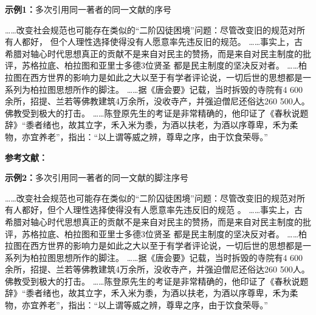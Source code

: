 \documentclass[twoside]{article}%
\begin{document}
\begin{refsection}
\textbf{示例1：}多次引用同一著者的同一文献的序号

……改变社会规范也可能存在类似的“二阶囚徒困境”问题：尽管改变旧的规范对所有人都好，
但个人理性选择使得没有人愿意率先违反旧的规范\cite{Sunstein1996-903-903}。
……事实上，古希腊对轴心时代思想真正的贡献不是来自对民主的赞扬，而是来自对民主制度的批评，苏格拉底、柏拉图和亚里士多德3位贤圣
都是民主制度的坚决反对者。
……柏拉图在西方世界的影响力是如此之大以至于有学者评论说，一切后世的思想都是一系列为柏拉图思想所作的脚注\cite{罗杰斯2011-15-16}。
……据《唐会要》记载，当时拆毁的寺院有4 600余所，招提、兰若等佛教建筑4万余所，没收寺产，并强迫僧尼还俗达260 500人。
佛教受到极大的打击。
……陈登原先生的考证是非常精确的，他印证了《春秋说题辞》“黍者绪也，故其立字，禾入米为黍，为酒以扶老，为酒以序尊卑，禾为柔物，亦宜养老”，指出：“以上谓等威之辨，尊卑之序，由于饮食荣辱。”\cite{陈登原2000-29-29}

\textbf{参考文献：}

\printbibliography[heading=none,env=indentegenv]
\end{refsection}

\begin{refsection}
\textbf{示例2：}多次引用同一著者的同一文献的脚注序号

\renewcommand{\thempfootnote}{\arabic{mpfootnote}}
\smallskip\noindent\begin{minipage}{\textwidth}\renewcommand{\thempfootnote}{\arabic{mpfootnote}}
\hspace{2em}……改变社会规范也可能存在类似的“二阶囚徒困境”问题：尽管改变旧的规范对所有人都好，但个人理性选择使得没有人愿意率先违反旧的规范
。
……事实上，古希腊对轴心时代思想真正的贡献不是来自对民主的赞扬，而是来自对民主制度的批评，苏格拉底、柏拉图和亚里士多德3位贤圣
都是民主制度的坚决反对者。
……柏拉图在西方世界的影响力是如此之大以至于有学者评论说，一切后世的思想都是一系列为柏拉图思想所作的脚注。
……据《唐会要》记载，当时拆毁的寺院有4 600余所，招提、兰若等佛教建筑4万余所，没收寺产，并强迫僧尼还俗达260 500人。
佛教受到极大的打击。
……陈登原先生的考证是非常精确的，他印证了《春秋说题辞》“黍者绪也，故其立字，禾入米为黍，为酒以扶老，为酒以序尊卑，禾为柔物，亦宜养老”，指出：“以上谓等威之辨，尊卑之序，由于饮食荣辱。”
\end{minipage}
\end{refsection}
\end{document}

